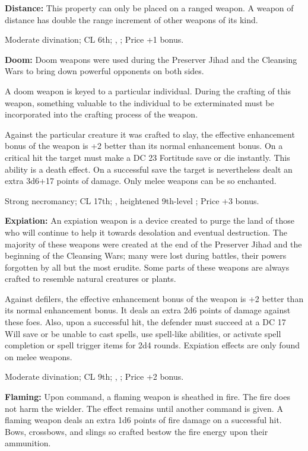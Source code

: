 \textbf{Distance:} This property can only be placed on a ranged weapon. A weapon of distance has double the range increment of other weapons of its kind.

Moderate divination; CL 6th; , ; Price +1 bonus.

\textbf{Doom:} Doom weapons were used during the Preserver Jihad and the Cleansing Wars to bring down powerful opponents on both sides.

A doom weapon is keyed to a particular individual. During the crafting of this weapon, something valuable to the individual to be exterminated must be incorporated into the crafting process of the weapon.

Against the particular creature it was crafted to slay, the effective enhancement bonus of the weapon is +2 better than its normal enhancement bonus. On a critical hit the target must make a DC 23 Fortitude save or die instantly. This ability is a death effect. On a successful save the target is nevertheless dealt an extra 3d6+17 points of damage. Only melee weapons can be so enchanted.

Strong necromancy; CL 17th; , heightened 9th-level ; Price +3 bonus.

\textbf{Expiation:} An expiation weapon is a device created to purge the land of those who will continue to help it towards desolation and eventual destruction. The majority of these weapons were created at the end of the Preserver Jihad and the beginning of the Cleansing Wars; many were lost during battles, their powers forgotten by all but the most erudite. Some parts of these weapons are always crafted to resemble natural creatures or plants.

Against defilers, the effective enhancement bonus of the weapon is +2 better than its normal enhancement bonus. It deals an extra 2d6 points of damage against these foes. Also, upon a successful hit, the defender must succeed at a DC 17 Will save or be unable to cast spells, use spell-like abilities, or activate spell completion or spell trigger items for 2d4 rounds. Expiation effects are only found on melee weapons.

Moderate divination; CL 9th; , ; Price +2 bonus.

\textbf{Flaming:} Upon command, a flaming weapon is sheathed in fire. The fire does not harm the wielder. The effect remains until another command is given. A flaming weapon deals an extra 1d6 points of fire damage on a successful hit. Bows, crossbows, and slings so crafted bestow the fire energy upon their ammunition.

